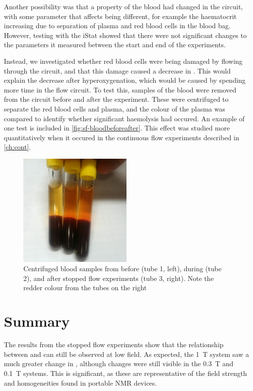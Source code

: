 Another possibility was that a property of the blood had changed in the circuit, with some parameter that affects \Ttwo being different, for example the haematocrit increasing due to separation of plasma and red blood cells in the blood bag.
However, testing with the iStat showed that there were not significant changes to the parameters it measured between the start and end of the experiments.

Instead, we investigated whether red blood cells were being damaged by flowing through the circuit, and that this damage caused a decrease in \Ttwo.
This would explain the \Ttwo decrease after hyperoxygenation, which would be caused by spending more time in the flow circuit.
To test this, samples of the blood were removed from the circuit before and after the experiment.
These were centrifuged to separate the red blood cells and plasma, and the colour of the plasma was compared to identify whether significant haemolysis had occured.
An example of one test is included in \autoref{fig:sf-bloodbeforeafter}.
This effect was studied more quantitatively when it occured in the continuous flow experiments described in \autoref{ch:cont}.

\begin{figure}[t]
\centering
\includegraphics[width=0.5\textwidth]{figures/stoppedflow/samplecheck.jpg}
\caption[Centrifuged blood samples from start and end of experiment]{Centrifuged blood samples from before (tube 1, left), during (tube 2), and after stopped flow experiments (tube 3, right). Note the redder colour from the tubes on the right}
\label{fig:sf-bloodbeforeafter}
\end{figure}

\section{Summary}
The results from the stopped flow experiments show that the relationship between \Ttwo and \SOtwo can still be observed at low field.
As expected, the \SI{1}{T} system saw a much greater change in \Ttwo, although changes were still visible in the \SI{0.3}{T} and \SI{0.1}{T} systems.
This is significant, as these are representative of the field strength and homogeneities found in portable NMR devices.

